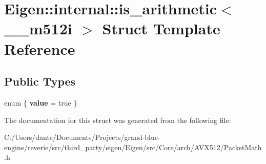 \hypertarget{struct_eigen_1_1internal_1_1is__arithmetic_3_01____m512i_01_4}{}\section{Eigen\+::internal\+::is\+\_\+arithmetic$<$ \+\_\+\+\_\+m512i $>$ Struct Template Reference}
\label{struct_eigen_1_1internal_1_1is__arithmetic_3_01____m512i_01_4}
\subsection*{Public Types}
\begin{DoxyCompactItemize}
\item 
\mbox{\label{struct_eigen_1_1internal_1_1is__arithmetic_3_01____m512i_01_4_a3a1f2869fe614796cdf071b3df308a2e}} 
enum \{ {\bfseries value} = true
 \}
\end{DoxyCompactItemize}


The documentation for this struct was generated from the following file\+:\begin{DoxyCompactItemize}
\item 
C\+:/\+Users/dante/\+Documents/\+Projects/grand-\/blue-\/engine/reverie/src/third\+\_\+party/eigen/\+Eigen/src/\+Core/arch/\+A\+V\+X512/Packet\+Math.\+h\end{DoxyCompactItemize}

